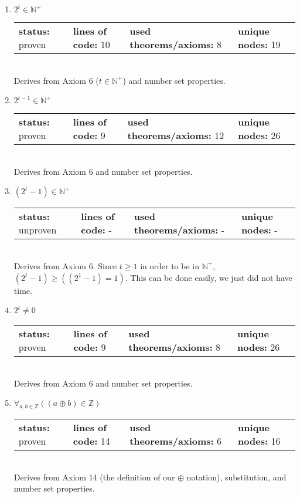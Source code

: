 \documentclass{article}[12pt]
\begin{document}
\begin{enumerate}
\item $2^{t} \in \mathbb{N}^+$ \hfill \\
  \begin{tabular}{l | l | l | l}
    \textbf{status:} proven & \textbf{lines of code:} 10 & \textbf{used theorems/axioms:} 8 & \textbf{unique nodes:} 19
  \end{tabular} \hfill \\
  Derives from Axiom 6 ($t \in \mathbb{N}^+$) and number set properties.
\item $2^{t - 1} \in \mathbb{N}^+$ \hfill \\
  \begin{tabular}{l | l | l | l}
    \textbf{status:} proven & \textbf{lines of code:} 9 & \textbf{used theorems/axioms:} 12 & \textbf{unique nodes:} 26
  \end{tabular} \hfill \\
  Derives from Axiom 6 and number set properties.
\item $\left(2^{t} - 1\right) \in \mathbb{N}^+$ \hfill \\
  \begin{tabular}{l | l | l | l}
    \textbf{status:} unproven & \textbf{lines of code:} - & \textbf{used theorems/axioms:} - & \textbf{unique nodes:} -
  \end{tabular} \hfill \\
  Derives from Axiom 6.  Since $t \geq 1$ in order to be in $\mathbb{N}^+$, $\left(2^{t} - 1\right) \geq \left((2^1 - 1) = 1\right)$.  This can be done easily, we just did not have time.
\item $2^{t} \neq 0$ \hfill \\
  \begin{tabular}{l | l | l | l}
    \textbf{status:} proven & \textbf{lines of code:} 9 & \textbf{used theorems/axioms:} 8 & \textbf{unique nodes:} 26
  \end{tabular} \hfill \\
  Derives from Axiom 6 and number set properties.
\item $\forall_{a, b \in \mathbb{Z}} \left(\left(a \oplus b\right) \in \mathbb{Z}\right)$ \hfill \\
  \begin{tabular}{l | l | l | l}
    \textbf{status:} proven & \textbf{lines of code:} 14 & \textbf{used theorems/axioms:} 6 & \textbf{unique nodes:} 16
  \end{tabular} \hfill \\
  Derives from Axiom 14 (the definition of our $\oplus$ notation), substitution, and number set properties.

\end{enumerate}
\end{document}
